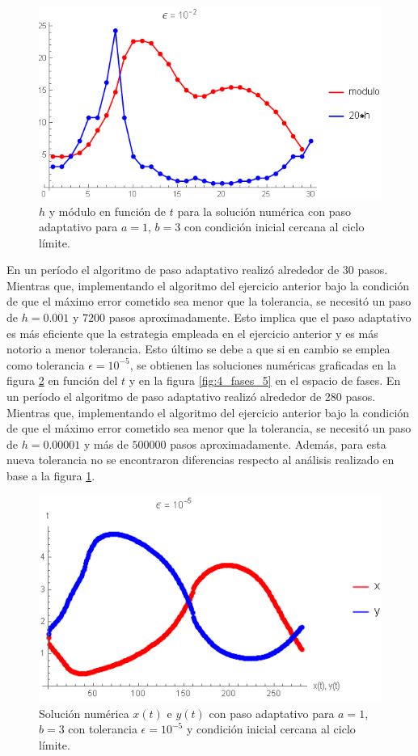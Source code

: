 \documentclass[aps,prb,twocolumn,superscriptaddress,floatfix,longbibliography]{revtex4-2}
\newcounter{para}
\begin{document}
\begin{figure}[]
    \includegraphics[clip=true,width=0.8\columnwidth]{4_h_2.png}
    \caption{$h$ y módulo en función de $t$ para la solución numérica con paso adaptativo para $a = 1$, $b = 3$ con condición inicial cercana al ciclo límite.}
     \label{fig:4_h_2}
\end{figure}


En un período el algoritmo de paso adaptativo realizó alrededor de 30 pasos. Mientras que, implementando el algoritmo del ejercicio anterior bajo la condición de que el máximo error cometido sea menor que la tolerancia, se necesitó un paso de $h = 0.001$ y $7200$ pasos aproximadamente. Esto implica que el paso adaptativo es más eficiente que la estrategia empleada en el ejercicio anterior y es más notorio a menor tolerancia. Esto último se debe a que si en cambio se emplea como tolerancia $\epsilon = 10^{-5}$, se obtienen las soluciones numéricas graficadas en la figura \ref{fig:4_xy_5} en función del $t$ y en la figura \ref{fig:4_fases_5} en el espacio de fases. En un período el algoritmo de paso adaptativo realizó alrededor de 280 pasos. Mientras que, implementando el algoritmo del ejercicio anterior bajo la condición de que el máximo error cometido sea menor que la tolerancia, se necesitó un paso de $h = 0.00001$ y más de $500000$ pasos aproximadamente. Además, para esta nueva tolerancia no se encontraron diferencias respecto al análisis realizado en base a la figura \ref{fig:4_h_2}.

\begin{figure}[]
    \includegraphics[clip=true,width=0.8\columnwidth]{4_xy_5.png}
    \caption{Solución numérica $x(t)$ e $y(t)$ con paso adaptativo para $a = 1$, $b = 3$ con tolerancia $\epsilon = 10^{-5}$ y condición inicial cercana al ciclo límite.}
     \label{fig:4_xy_5}
\end{figure}
\end{document}
